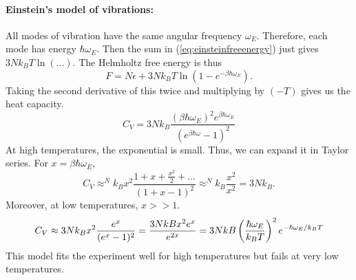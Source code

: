     \paragraph{Einstein's model of vibrations:}All modes of vibration have the same angular frequency $\omega_E$. Therefore, each mode has energy $\hbar\omega_E$. Then the sum in (\ref{eq:einsteinfreeenergy}) just gives $3Nk_BT\ln(...)$. The Helmholtz free energy is thus
    \begin{equation}
        F = N\epsilon + 3Nk_BT\ln(1-e^{-\beta\hbar\omega_E}).
        \label{eq:einsteinfreeenergy2}
    \end{equation}
    Taking the second derivative of this twice and multiplying by $(-T)$ gives us the heat capacity.
    \begin{equation}
        C_V = 3Nk_B\frac{(\beta\hbar\omega_E)^2e^{\beta\hbar\omega_E}}{(e^{\beta\hbar\omega}-1)^2}
    \end{equation}
    At high temperatures, the exponential is small. Thus, we can expand it in Taylor series. For $x=\beta\hbar\omega_E$,
    \begin{equation}
        C_V\approx ^Nk_Bx^2\frac{1+x+\frac{x^2}{2}+...}{(1+x-1)^2}\approx ^Nk_B\frac{x^2}{x^2}=3Nk_B.
    \end{equation}
    Moreover, at low temperatures, $x>>1$. 
    \begin{equation}
        C_V\approx 3Nk_Bx^2\frac{e^x}{(e^x-1)^2}=\frac{3NkBx^2e^x}{e^{2x}}=3NkB\left( \frac{\hbar\omega_E}{k_BT} \right)^2e^{-\hbar\omega_E/k_BT}
    \end{equation}
    This model fits the experiment well for high temperatures but fails at very low temperatures. 

